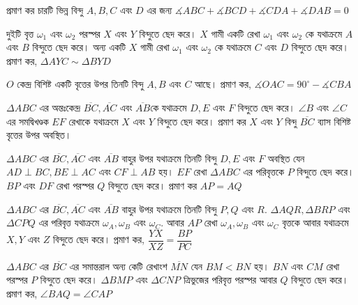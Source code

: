 \documentclass[a4paper,11pt]{article}
\newcommand{\drg}{^{\circ}}
\begin{document}
\newpage
\begin{Exercise}
	\begin{prob}
		প্রমাণ কর চারটি ভিন্ন বিন্দু $A,B,C$ এবং $D$ এর জন্য $\measuredangle ABC+\measuredangle BCD+\measuredangle CDA+\measuredangle DAB=0$
	\end{prob}
	\begin{prob}
		দুইটি বৃত্ত $\omega_1$ এবং $\omega_2$ পরস্পর $X$ এবং $Y$ বিন্দুতে ছেদ করে। $X$ গামী একটি রেখা $\omega_1$ এবং $\omega_2$ কে যথাক্রমে $A$ এবং $B$ বিন্দুতে ছেদ করে। অন্য একটি $X$ গামী রেখা $\omega_1$ এবং $\omega_2$ কে যথাক্রমে $C$ এবং $D$ বিন্দুতে ছেদ করে। প্রমাণ কর, $\Delta AYC \sim \Delta BYD$
	\end{prob}
	\begin{prob}
		$O$ কেন্দ্র বিশিষ্ট একটি বৃত্তের উপর তিনটি বিন্দু $A,B$ এবং $C$ আছে। প্রমাণ কর, $\measuredangle OAC=90\drg-\measuredangle CBA$
	\end{prob}
	\begin{prob}
		$\Delta ABC$ এর অন্তঃকেন্দ্র $\overline{BC}, \overline{AC}$ এবং $\overline{AB}$কে যথাক্রমে $D,E$ এবং $F$ বিন্দুতে ছেদ করে। $\angle B$ এবং $\angle C$ এর সমদ্বিখণ্ডক $EF$ রেখাকে যথাক্রমে $X$ এবং $Y$ বিন্দুতে ছেদ করে। প্রমাণ কর $X$ এবং $Y$ বিন্দু $\overline{BC}$ ব্যাস বিশিষ্ট বৃত্তের উপর অবস্থিত। 
	\end{prob}
	\begin{prob}[Shortlist 2010/G1]
		$\Delta ABC$ এর $\overline{BC}, \overline{AC}$ এবং $\overline{AB}$ বাহুর উপর যথাক্রমে তিনটি বিন্দু $D,E$ এবং $F$ অবস্থিত যেন $AD \perp BC, BE \perp AC$ এবং $CF \perp AB$ হয়। $EF$ রেখা $\Delta ABC$ এর পরিবৃত্তকে $P$ বিন্দুতে ছেদ করে। $BP$ এবং $DF$ রেখা পরস্পর $Q$ বিন্দুতে ছেদ করে। প্রমাণ কর $AP=AQ$
	\end{prob}
	\begin{prob}[USAMO 2013/1]
		$\Delta ABC$ এর $\overline{BC}, \overline{AC}$ এবং $\overline{AB}$ বাহুর উপর যথাক্রমে তিনটি বিন্দু $P,Q$ এবং $R$. $\Delta AQR, \Delta BRP$ এবং $\Delta CPQ$ এর পরিবৃত্ত যথাক্রমে $\omega_A, \omega_B$ এবং $\omega_C$. আবার $AP$ রেখা $\omega_A, \omega_B$ এবং $\omega_C$ বৃত্তকে আবার যথাক্রমে $X,Y$ এবং $Z$ বিন্দুতে ছেদ করে। প্রমাণ কর, $\dfrac{YX}{XZ}=\dfrac{BP}{PC}$
	\end{prob}
	\begin{prob}[Balakan 2009]
		$\Delta ABC$ এর $\overline{BC}$ এর সমান্তরাল অন্য কেটি রেখাংশ $\overline{MN}$ যেন $BM<BN$ হয়। $BN$ এবং $CM$ রেখা পরস্পর $P$ বিন্দুতে ছেদ করে। $\Delta BMP$ এবং $\Delta CNP$ ত্রিভুজের পরিবৃত্ত পরস্পর আবার $Q$ বিন্দুতে ছেদ করে। প্রমাণ কর, $\angle BAQ=\angle CAP$
	\end{prob}
\end{Exercise}
\newpage
\end{document}
